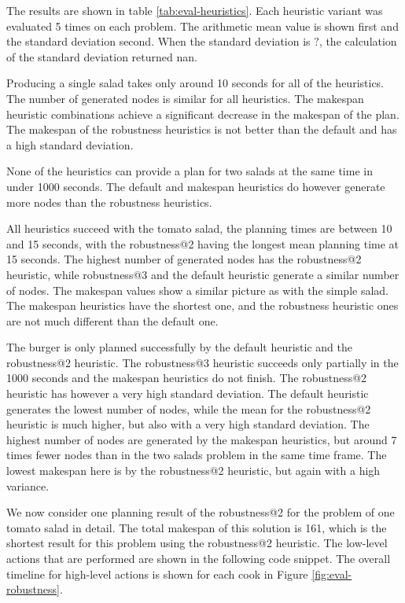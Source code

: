 The results are shown in table \ref{tab:eval-heuristics}.
Each heuristic variant was evaluated 5 times on each problem.
The arithmetic mean value is shown first and the standard deviation second.
When the standard deviation is $?$, the calculation of the standard deviation returned nan.

Producing a single salad takes only around 10 seconds for all of the heuristics.
The number of generated nodes is similar for all heuristics.
The makespan heuristic combinations achieve a significant decrease in the makespan of the plan.
The makespan of the robustness heuristics is not better than the default and has a high standard deviation.

None of the heuristics can provide a plan for two salads at the same time in under 1000 seconds.
The default and makespan heuristics do however generate more nodes than the robustness heuristics.

All heuristics succeed with the tomato salad, the planning times are between 10 and 15 seconds, with the robustness@2 having the longest mean planning time at 15 seconds.
The highest number of generated nodes has the robustness@2 heuristic, while robustness@3 and the default heuristic generate a similar number of nodes.
The makespan values show a similar picture as with the simple salad.
The makespan heuristics have the shortest one, and the robustness heuristic ones are not much different than the default one.

The burger is only planned successfully by the default heuristic and the robustness@2 heuristic.
The robustness@3 heuristic succeeds only partially  in the 1000 seconds and the makespan heuristics do not finish.
The robustness@2 heuristic has however a very high standard deviation.
The default heuristic generates the lowest number of nodes, while the mean for the robustness@2 heuristic is much higher, but also with a very high standard deviation.
The highest number of nodes are generated by the makespan heuristics, but around 7 times fewer nodes than in the two salads problem in the same time frame.
The lowest makespan here is by the robustness@2 heuristic, but again with a high variance.

We now consider one planning result of the robustness@2 for the problem of one tomato salad in detail.
The total makespan of this solution is 161, which is the shortest result for this problem using the robustness@2 heuristic.
The low-level actions that are performed are shown in the following code snippet.
The overall timeline for high-level actions is shown for each cook in Figure \ref{fig:eval-robustness}.

